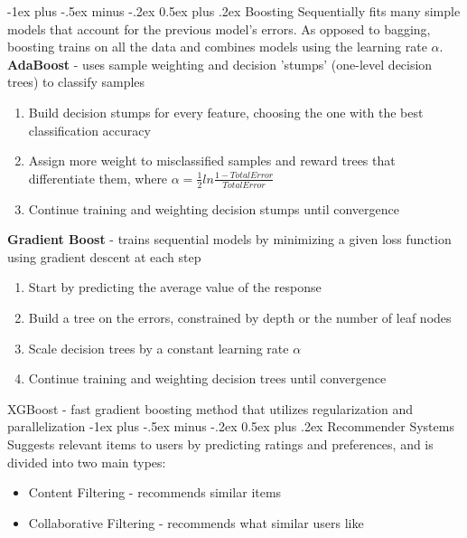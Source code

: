 \documentclass[10pt,landscape]{article}
\makeatletter
\renewcommand{\section}{\@startsection{section}{1}{0mm}%
                                {-1ex plus -.5ex minus -.2ex}%
                                {0.5ex plus .2ex}%
                                {\normalfont\large\bfseries}}
\makeatother
\begin{document}
\begin{multicols}{3}
\section{Boosting}
Sequentially fits many simple models that account for the previous model's errors. As opposed to bagging, boosting trains on all the data and combines models using the learning rate $\alpha$. \\
\smallskip
\textbf{AdaBoost} - uses sample weighting and decision 'stumps' (one-level decision trees) to classify samples
\begin{enumerate}[leftmargin=5mm]
\itemsep -.4mm
\item Build decision stumps for every feature, choosing the one with the best classification accuracy
\item Assign more weight to misclassified samples and reward trees that differentiate them, where  $\alpha = \frac{1}{2}ln\frac{1-TotalError}{TotalError}$
\item Continue training and weighting decision stumps until convergence
\end{enumerate}

\textbf{Gradient Boost} - trains sequential models by minimizing a given loss function using gradient descent at each step
\begin{enumerate}[leftmargin=5mm]
\itemsep -.4mm
\item Start by predicting the average value of the response
\item Build a tree on the errors, constrained by depth or the number of leaf nodes
\item Scale decision trees by a constant learning rate $\alpha$
\item Continue training and weighting decision trees until convergence
\end{enumerate}

XGBoost - fast gradient boosting method that utilizes regularization and parallelization
\section{Recommender Systems}
Suggests relevant items to users by predicting ratings and preferences, and is divided into two main types:
\begin{itemize}[label={--},leftmargin=4mm]
\itemsep -.4mm
\item Content Filtering - recommends similar items
\item Collaborative Filtering - recommends what similar users like
\end{itemize}


\end{multicols}
\end{document}
